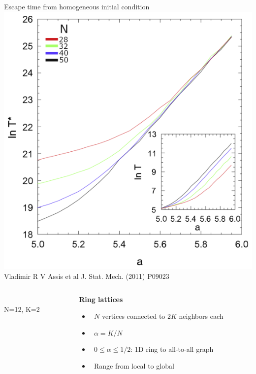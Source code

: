\documentclass[serif,mathserif]{beamer}
\begin{document}
\begin{frame}
    \centering
    Escape time from homogeneous initial condition\\
    \vspace{0.8cm}
    \includegraphics[height=0.75\textheight]{escapetime.eps}\\
    Vladimir R V Assis et al J. Stat. Mech. (2011) P09023
\end{frame}

\begin{frame}
    \begin{columns}
        \begin{column}{.5\textwidth}
            \\
            \vspace{0.1cm}
            N=12, K=2
        \end{column}
        \begin{column}{.5\textwidth}
            \textbf{Ring lattices}
            \begin{itemize}
                \vspace{0.25cm}
                \item \ \pause $N$ vertices connected to $2K$ neighbors each
                \vspace{0.25cm}
                \item \ \pause $\alpha = K/N$
                \vspace{0.25cm}
                \item \ \pause $0 \leq \alpha \leq 1/2$: 1D ring to all-to-all graph
                \vspace{0.25cm}
                \item \ \pause Range from local to global
            \end{itemize}
        \end{column}
    \end{columns}
\end{frame}
\end{document}
